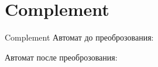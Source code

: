 \section{Complement}
\begin{frame}{Complement}
	Автомат до преоброзования:


	Автомат после преоброзования:

\end{frame}
